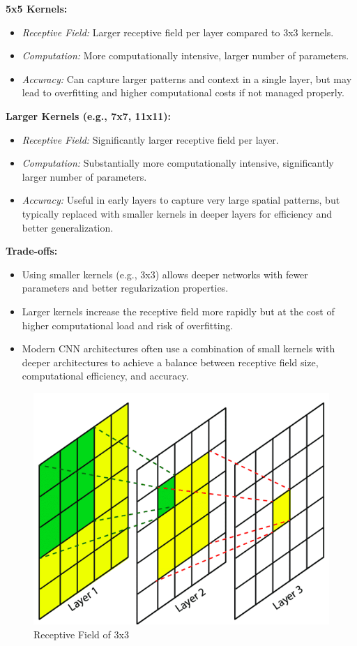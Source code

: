 \documentclass[12pt]{article}
\begin{document}
\textbf{5x5 Kernels:}
\begin{itemize}
    \item \textit{Receptive Field:} Larger receptive field per layer compared to 3x3 kernels.
    \item \textit{Computation:} More computationally intensive, larger number of parameters.
    \item \textit{Accuracy:} Can capture larger patterns and context in a single layer, but may lead to overfitting and higher computational costs if not managed properly.
\end{itemize}

\textbf{Larger Kernels (e.g., 7x7, 11x11):}
\begin{itemize}
    \item \textit{Receptive Field:} Significantly larger receptive field per layer.
    \item \textit{Computation:} Substantially more computationally intensive, significantly larger number of parameters.
    \item \textit{Accuracy:} Useful in early layers to capture very large spatial patterns, but typically replaced with smaller kernels in deeper layers for efficiency and better generalization.
\end{itemize}

\textbf{Trade-offs:}
\begin{itemize}
    \item Using smaller kernels (e.g., 3x3) allows deeper networks with fewer parameters and better regularization properties.
    \item Larger kernels increase the receptive field more rapidly but at the cost of higher computational load and risk of overfitting.
    \item Modern CNN architectures often use a combination of small kernels with deeper architectures to achieve a balance between receptive field size, computational efficiency, and accuracy.
\end{itemize}

\begin{figure}[h]
    \centering
    \includegraphics[scale=0.3]{./media/receptive_field.png}
    \caption{Receptive Field of 3x3}
    \label{fig:receptive_field}
\end{figure}
\end{document}
